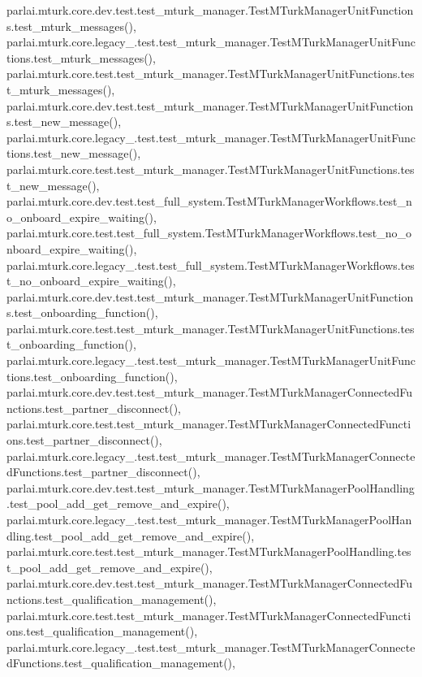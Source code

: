 parlai.\+mturk.\+core.\+dev.\+test.\+test\+\_\+mturk\+\_\+manager.\+Test\+M\+Turk\+Manager\+Unit\+Functions.\+test\+\_\+mturk\+\_\+messages(), parlai.\+mturk.\+core.\+legacy\+\_.\+test.\+test\+\_\+mturk\+\_\+manager.\+Test\+M\+Turk\+Manager\+Unit\+Functions.\+test\+\_\+mturk\+\_\+messages(), parlai.\+mturk.\+core.\+test.\+test\+\_\+mturk\+\_\+manager.\+Test\+M\+Turk\+Manager\+Unit\+Functions.\+test\+\_\+mturk\+\_\+messages(), parlai.\+mturk.\+core.\+dev.\+test.\+test\+\_\+mturk\+\_\+manager.\+Test\+M\+Turk\+Manager\+Unit\+Functions.\+test\+\_\+new\+\_\+message(), parlai.\+mturk.\+core.\+legacy\+\_.\+test.\+test\+\_\+mturk\+\_\+manager.\+Test\+M\+Turk\+Manager\+Unit\+Functions.\+test\+\_\+new\+\_\+message(), parlai.\+mturk.\+core.\+test.\+test\+\_\+mturk\+\_\+manager.\+Test\+M\+Turk\+Manager\+Unit\+Functions.\+test\+\_\+new\+\_\+message(), parlai.\+mturk.\+core.\+dev.\+test.\+test\+\_\+full\+\_\+system.\+Test\+M\+Turk\+Manager\+Workflows.\+test\+\_\+no\+\_\+onboard\+\_\+expire\+\_\+waiting(), parlai.\+mturk.\+core.\+test.\+test\+\_\+full\+\_\+system.\+Test\+M\+Turk\+Manager\+Workflows.\+test\+\_\+no\+\_\+onboard\+\_\+expire\+\_\+waiting(), parlai.\+mturk.\+core.\+legacy\+\_.\+test.\+test\+\_\+full\+\_\+system.\+Test\+M\+Turk\+Manager\+Workflows.\+test\+\_\+no\+\_\+onboard\+\_\+expire\+\_\+waiting(), parlai.\+mturk.\+core.\+dev.\+test.\+test\+\_\+mturk\+\_\+manager.\+Test\+M\+Turk\+Manager\+Unit\+Functions.\+test\+\_\+onboarding\+\_\+function(), parlai.\+mturk.\+core.\+test.\+test\+\_\+mturk\+\_\+manager.\+Test\+M\+Turk\+Manager\+Unit\+Functions.\+test\+\_\+onboarding\+\_\+function(), parlai.\+mturk.\+core.\+legacy\+\_.\+test.\+test\+\_\+mturk\+\_\+manager.\+Test\+M\+Turk\+Manager\+Unit\+Functions.\+test\+\_\+onboarding\+\_\+function(), parlai.\+mturk.\+core.\+dev.\+test.\+test\+\_\+mturk\+\_\+manager.\+Test\+M\+Turk\+Manager\+Connected\+Functions.\+test\+\_\+partner\+\_\+disconnect(), parlai.\+mturk.\+core.\+test.\+test\+\_\+mturk\+\_\+manager.\+Test\+M\+Turk\+Manager\+Connected\+Functions.\+test\+\_\+partner\+\_\+disconnect(), parlai.\+mturk.\+core.\+legacy\+\_.\+test.\+test\+\_\+mturk\+\_\+manager.\+Test\+M\+Turk\+Manager\+Connected\+Functions.\+test\+\_\+partner\+\_\+disconnect(), parlai.\+mturk.\+core.\+dev.\+test.\+test\+\_\+mturk\+\_\+manager.\+Test\+M\+Turk\+Manager\+Pool\+Handling.\+test\+\_\+pool\+\_\+add\+\_\+get\+\_\+remove\+\_\+and\+\_\+expire(), parlai.\+mturk.\+core.\+legacy\+\_.\+test.\+test\+\_\+mturk\+\_\+manager.\+Test\+M\+Turk\+Manager\+Pool\+Handling.\+test\+\_\+pool\+\_\+add\+\_\+get\+\_\+remove\+\_\+and\+\_\+expire(), parlai.\+mturk.\+core.\+test.\+test\+\_\+mturk\+\_\+manager.\+Test\+M\+Turk\+Manager\+Pool\+Handling.\+test\+\_\+pool\+\_\+add\+\_\+get\+\_\+remove\+\_\+and\+\_\+expire(), parlai.\+mturk.\+core.\+dev.\+test.\+test\+\_\+mturk\+\_\+manager.\+Test\+M\+Turk\+Manager\+Connected\+Functions.\+test\+\_\+qualification\+\_\+management(), parlai.\+mturk.\+core.\+test.\+test\+\_\+mturk\+\_\+manager.\+Test\+M\+Turk\+Manager\+Connected\+Functions.\+test\+\_\+qualification\+\_\+management(), parlai.\+mturk.\+core.\+legacy\+\_.\+test.\+test\+\_\+mturk\+\_\+manager.\+Test\+M\+Turk\+Manager\+Connected\+Functions.\+test\+\_\+qualification\+\_\+management(), 